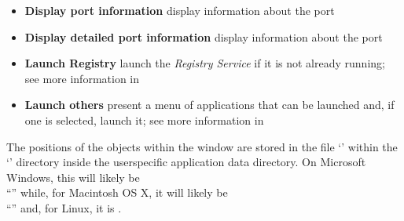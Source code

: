 \begin{itemize}
\item\textbf{Display port information} display information about the port
\item\exSp\textbf{Display detailed port information} display information about the port
\item\exSp\textbf{Launch Registry} launch the \emph{Registry Service} if it is not already
running; see more information in\\
\item\exSp\textbf{Launch others \textellipsis} present a menu of applications that can be
launched and, if one is selected, launch it; see more information in
\end{itemize}
The positions of the objects within the window are stored in the file
`' within the `' directory inside the
user\longDash{}specific application data directory.
On Microsoft Windows, this will likely be\\
``'' while, for Macintosh OS X, it will likely be\\
``'' and, for Linux, it is \TBD.\\
\primaryEnd{}
